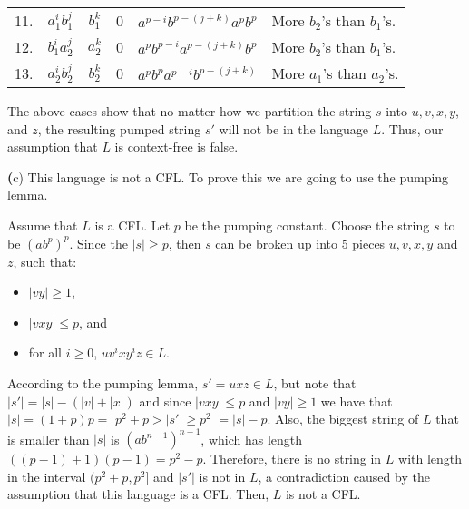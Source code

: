\documentclass[11pt]{article}
\renewcommand{\part}[1] {{\vspace{0.15in}\noindent\textbf (#1)} \vspace{0.10in}}
\begin{document}
\begin{longtable}{|c|c|c|c|p{2in}|p{2.75in}|}
11. & $a_1^ib_1^j$ & $b_1^k$  & 0 & $a^{p - i}b^{p - (j + k)}a^pb^p$ & More $b_2$'s than $b_1$'s. \\ [0.7cm]

12. & $b_1^ia_2^j$ & $a_2^k$  & 0 & $a^pb^{p - i}a^{p - (j + k)}b^p$ & More $b_2$'s than $b_1$'s. \\ [0.7cm]

13. & $a_2^ib_2^j$ & $b_2^k$  & 0 & $a^pb^pa^{p - i}b^{p - (j + k)}$ & More $a_1$'s than $a_2$'s. \\ [0.7cm]


\hline 
\end{longtable}

The above cases show that no matter how we partition the string $s$ into $u,v,x, y$, and $z$, the resulting pumped string $s'$ will not be in the language $L$.  Thus, our assumption that $L$ is context-free is false. 


\part{c}
This language is not a CFL. To prove this we are going to use the pumping lemma.

Assume that $L$ is a CFL.  Let $p$ be the pumping constant.  Choose the string $s$ to be $(ab^p)^p$.  Since the $|s| \geq p$, then $s$ can be broken up into 5 pieces $u,v,x,y$ and $z$, such that:
\begin{itemize}
	\item $|vy| \geq 1$,
	\item $|vxy| \leq p$, and
	\item for all $i \geq 0$, $uv^ixy^iz \in L$.
\end{itemize} 

According to the pumping lemma, $s'= uxz \in L$, but note that $|s'| = |s| - (|v| + |x|)$ and since $|vxy| \leq p$ and $|vy| \geq 1$ we have that $ |s| = (1 + p)p =$ \underline{$ p^2 + p > |s'| \geq p^2$} $ = |s| - p$. Also, the biggest string of $L$ that is smaller than $|s|$ is $(ab^{n-1})^{n-1}$, which has length $((p-1) + 1)(p - 1) = p^2 - p$. Therefore, there is no string in $L$ with length in the interval $(p^2 + p, p^2]$ and $|s'|$ is not in $L$, a contradiction caused by the assumption that this language is a CFL. Then, $L$ is not a CFL.
\end{document}
